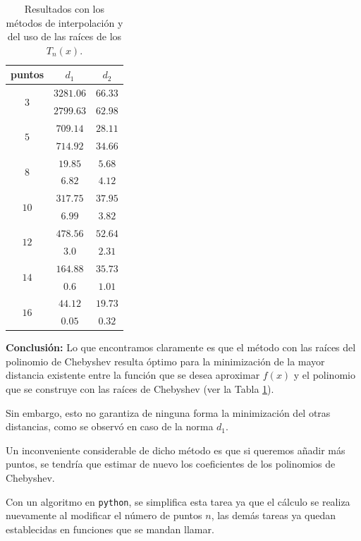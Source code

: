 \documentclass[12pt]{article}
\numberwithin{equation}{section}
\begin{document}
\vspace*{0.5em}
\begin{table}
\caption{Resultados con los métodos de interpolación y del uso de las raíces de los $T_{n}(x)$.}\label{tab:tabla_01}
\begin{tabular}{| c | c | c |} \hline
puntos & $d_{1}$ & $d_{2}$ \\\hline
\multirow{2}{*}{$3$} & $3281.06$ & $66.33$ \\ \cline{2-3}
 & $2799.63$ & $62.98$ \\ \hline
\multirow{2}{*}{$5$} & $709.14$ & $28.11$ \\ \cline{2-3}
 & $714.92$ & $34.66$ \\ \hline 
\multirow{2}{*}{$8$} & $19.85$ & $5.68$ \\ \cline{2-3}
 & $6.82$ & $4.12$ \\ \hline
\multirow{2}{*}{$10$} & $317.75$ & $37.95$ \\ \cline{2-3}
 & $6.99$ & $3.82$ \\ \hline
\multirow{2}{*}{$12$} & $478.56$ & $52.64$ \\ \cline{2-3}
 & $3.0$ & $2.31$ \\ \hline 
\multirow{2}{*}{$14$} & $164.88$ & $35.73$ \\ \cline{2-3}
 & $0.6$ & $1.01$ \\ \hline
\multirow{2}{*}{$16$} & $44.12$ & $19.73$ \\ \cline{2-3}
 & $0.05$ & $0.32$ \\ \hline
\end{tabular}
\end{table}

\textbf{Conclusión: } Lo que encontramos claramente es que el método con las raíces del polinomio de Chebyshev resulta óptimo para la minimización de la mayor distancia existente entre la función que se desea aproximar $f(x)$ y el polinomio que se construye con las raíces de Chebyshev (ver la Tabla \ref{tab:tabla_01}).
\par
Sin embargo, esto no garantiza de ninguna forma la minimización del otras distancias, como se observó en caso de la norma $d_{1}$.
\par
Un inconveniente considerable de dicho método es que si queremos añadir más puntos, se tendría que estimar de nuevo los coeficientes de los polinomios de Chebyshev.
\par
Con un algoritmo en \texttt{python}, se simplifica esta tarea ya que el cálculo se realiza nuevamente al modificar el número de puntos $n$, las demás tareas ya quedan establecidas en funciones que se mandan llamar.
\end{document}
